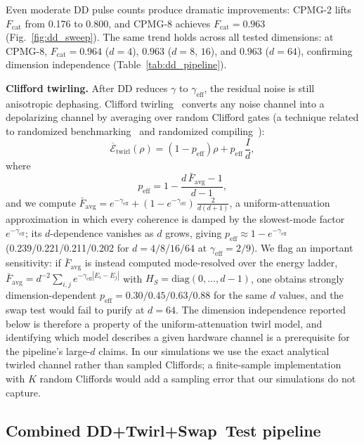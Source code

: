 \documentclass[a4paper,twocolumn]{quantumarticle}
\begin{document}
Even moderate DD pulse counts produce dramatic improvements: CPMG-2 lifts $F_\mathrm{cat}$ from 0.176 to 0.800, and CPMG-8 achieves $F_\mathrm{cat} = 0.963$ (Fig.~\ref{fig:dd_sweep}).
The same trend holds across all tested dimensions: at CPMG-8, $F_\mathrm{cat} = 0.964$ ($d = 4$), $0.963$ ($d = 8$, $16$), and $0.963$ ($d = 64$), confirming dimension independence (Table~\ref{tab:dd_pipeline}).

\textbf{Clifford twirling.}
After DD reduces $\gamma$ to $\gamma_\mathrm{eff}$, the residual noise is still anisotropic dephasing.
Clifford twirling~\cite{Dankert2009,Wallman2016} converts any noise channel into a depolarizing channel by averaging over random Clifford gates (a technique related to randomized benchmarking~\cite{Dankert2009} and randomized compiling~\cite{Wallman2016}):
\begin{equation}
\overline{\mathcal{E}}_\mathrm{twirl}(\rho) = (1 - p_\mathrm{eff})\rho + p_\mathrm{eff}\, \frac{I}{d},
\label{eq:twirl}
\end{equation}
where
\begin{equation}
p_\mathrm{eff} = 1 - \frac{d\, \bar{F}_\mathrm{avg} - 1}{d - 1},
\label{eq:p_eff}
\end{equation}
and we compute $\bar{F}_\mathrm{avg} = e^{-\gamma_\mathrm{eff}} + (1 - e^{-\gamma_\mathrm{eff}})\,\frac{2}{d(d+1)}$, a uniform-attenuation approximation in which every coherence is damped by the slowest-mode factor $e^{-\gamma_\mathrm{eff}}$; its $d$-dependence vanishes as $d$ grows, giving $p_\mathrm{eff} \approx 1 - e^{-\gamma_\mathrm{eff}}$ (0.239/0.221/0.211/0.202 for $d = 4/8/16/64$ at $\gamma_\mathrm{eff} = 2/9$).
We flag an important sensitivity: if $\bar{F}_\mathrm{avg}$ is instead computed mode-resolved over the energy ladder, $\bar{F}_\mathrm{avg} = d^{-2}\sum_{i,j} e^{-\gamma_\mathrm{eff}|E_i - E_j|}$ with $H_S = \mathrm{diag}(0, \ldots, d-1)$, one obtains strongly dimension-dependent $p_\mathrm{eff} = 0.30/0.45/0.63/0.88$ for the same $d$ values, and the swap test would fail to purify at $d = 64$.
The dimension independence reported below is therefore a property of the uniform-attenuation twirl model, and identifying which model describes a given hardware channel is a prerequisite for the pipeline's large-$d$ claims.
In our simulations we use the exact analytical twirled channel rather than sampled Cliffords; a finite-sample implementation with $K$ random Cliffords would add a sampling error that our simulations do not capture.


\subsection{Combined DD+Twirl+Swap~Test pipeline}
\label{sec:pipeline}
\end{document}
